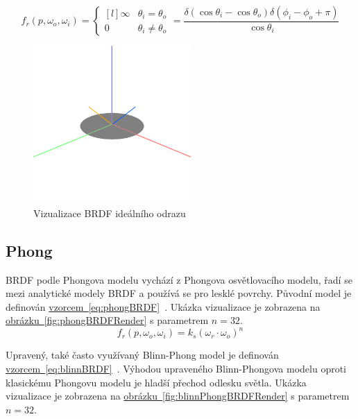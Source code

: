 \documentclass[czech,master]{diploma}
\newcommand{\point}{p}
\newcommand{\brdf}{f_r\left(\point,\omega_{o},\omega_{i}\right)}
\newcommand{\outVec}{\omega_{o}}
\newcommand{\refl}{\omega_{r}}
\begin{document}
\begin{equation} \label{eq:idealReflectionBRDF}
  \brdf  =  \left\{\begin{matrix*}[l] \infty & \theta_i = \theta_o \\ 0 & \theta_i \neq \theta_o \end{matrix*}\right. = \frac{\delta\left(\cos\theta_i-\cos\theta_o\right)\delta\left(\phi_i-\phi_o+\pi\right)}{\cos\theta_i}
\end{equation}


\begin{figure}[ht]%
  \centering
  \includegraphics[width=6cm]{Figures/visualizations/brdfMirror.png}
  \caption{Vizualizace BRDF ideálního odrazu}%
  \label{fig:idealReflectionBRDFViz}%
\end{figure}


\subsection{Phong} \label{sec:Phong}
BRDF podle Phongova modelu vychází z Phongova osvětlovacího modelu, řadí se mezi analytické modely BRDF a používá se pro lesklé povrchy. Původní model je definován \hyperref[eq:phongBRDF]{vzorcem~\ref{eq:phongBRDF}}~\cite{Phong1975}. Ukázka vizualizace je zobrazena na \hyperref[fig:phongBRDFRender]{obrázku~\ref{fig:phongBRDFRender}} s parametrem \(n = 32\).
\begin{equation} \label{eq:phongBRDF}
  \brdf = k_s{(\refl\cdot\outVec)}^{n}
\end{equation}

Upravený, také často využívaný Blinn-Phong model je definován \hyperref[eq:blinnBRDF]{vzorcem~\ref{eq:blinnBRDF}}~\cite{BlinnPhong1977}. Výhodou upraveného Blinn-Phongova modelu oproti klasickému Phongovu modelu je hladší přechod odlesku světla. Ukázka vizualizace je zobrazena na \hyperref[fig:blinnPhongBRDFRender]{obrázku~\ref{fig:blinnPhongBRDFRender}} s parametrem \(n = 32\).
\end{document}

